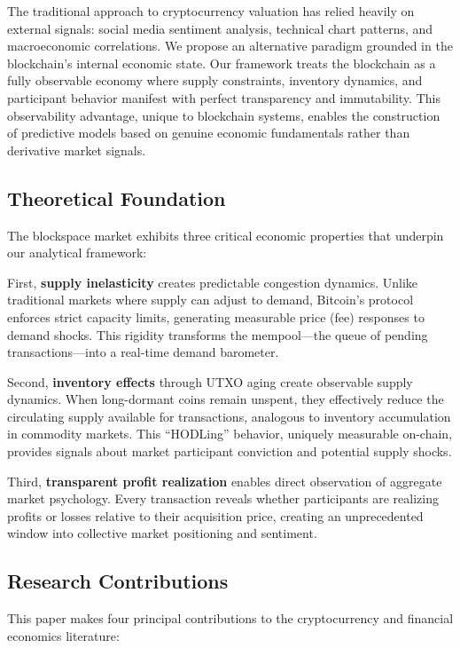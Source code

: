 \documentclass[
  12pt,
  letterpaper,
  DIV=11,
  numbers=noendperiod]{scrartcl}
\begin{document}
The traditional approach to cryptocurrency valuation has relied heavily
on external signals: social media sentiment analysis, technical chart
patterns, and macroeconomic correlations. We propose an alternative
paradigm grounded in the blockchain's internal economic state. Our
framework treats the blockchain as a fully observable economy where
supply constraints, inventory dynamics, and participant behavior
manifest with perfect transparency and immutability. This observability
advantage, unique to blockchain systems, enables the construction of
predictive models based on genuine economic fundamentals rather than
derivative market signals.

\subsection{Theoretical Foundation}\label{theoretical-foundation}

The blockspace market exhibits three critical economic properties that
underpin our analytical framework:

First, \textbf{supply inelasticity} creates predictable congestion
dynamics. Unlike traditional markets where supply can adjust to demand,
Bitcoin's protocol enforces strict capacity limits, generating
measurable price (fee) responses to demand shocks. This rigidity
transforms the mempool---the queue of pending transactions---into a
real-time demand barometer.

Second, \textbf{inventory effects} through UTXO aging create observable
supply dynamics. When long-dormant coins remain unspent, they
effectively reduce the circulating supply available for transactions,
analogous to inventory accumulation in commodity markets. This
``HODLing'' behavior, uniquely measurable on-chain, provides signals
about market participant conviction and potential supply shocks.

Third, \textbf{transparent profit realization} enables direct
observation of aggregate market psychology. Every transaction reveals
whether participants are realizing profits or losses relative to their
acquisition price, creating an unprecedented window into collective
market positioning and sentiment.

\subsection{Research Contributions}\label{research-contributions}

This paper makes four principal contributions to the cryptocurrency and
financial economics literature:
\end{document}
